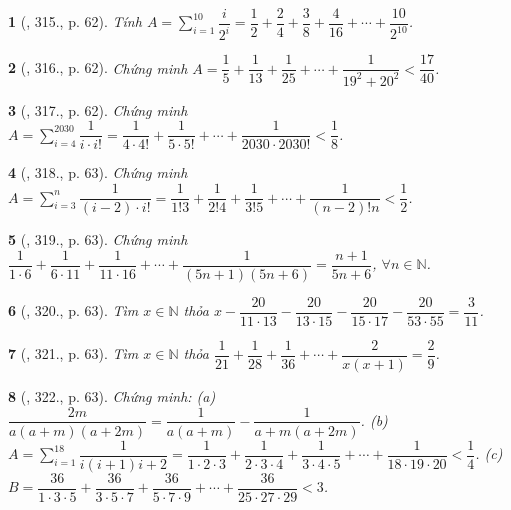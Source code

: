 \documentclass{article}
\newtheorem{baitoan}{}
\begin{document}
\begin{baitoan}[\cite{Tuyen_Toan_6}, 315., p. 62]
	Tính $A = \sum_{i=1}^{10} \dfrac{i}{2^i} = \dfrac{1}{2} + \dfrac{2}{4} + \dfrac{3}{8} + \dfrac{4}{16} + \cdots + \dfrac{10}{2^{10}}$.
\end{baitoan}

\begin{baitoan}[\cite{Tuyen_Toan_6}, 316., p. 62]
	Chứng minh $A = \dfrac{1}{5} + \dfrac{1}{13} + \dfrac{1}{25} + \cdots + \dfrac{1}{19^2 + 20^2} < \dfrac{17}{40}$.
\end{baitoan}

\begin{baitoan}[\cite{Tuyen_Toan_6}, 317., p. 62]
	Chứng minh $A = \sum_{i=4}^{2030} \dfrac{1}{i\cdot i!} = \dfrac{1}{4\cdot4!} + \dfrac{1}{5\cdot5!} + \cdots + \dfrac{1}{2030\cdot2030!} < \dfrac{1}{8}$.
\end{baitoan}

\begin{baitoan}[\cite{Tuyen_Toan_6}, 318., p. 63]
	Chứng minh $A = \sum_{i=3}^n \dfrac{1}{(i - 2)\cdot i!} = \dfrac{1}{1!3} + \dfrac{1}{2!4} + \dfrac{1}{3!5} + \cdots + \dfrac{1}{(n - 2)!n} < \dfrac{1}{2}$.
\end{baitoan}

\begin{baitoan}[\cite{Tuyen_Toan_6}, 319., p. 63]
	Chứng minh $\dfrac{1}{1\cdot6} + \dfrac{1}{6\cdot11} + \dfrac{1}{11\cdot16} + \cdots + \dfrac{1}{(5n + 1)(5n + 6)} = \dfrac{n + 1}{5n + 6}$, $\forall n\in\mathbb{N}$.
\end{baitoan}

\begin{baitoan}[\cite{Tuyen_Toan_6}, 320., p. 63]
	Tìm $x\in\mathbb{N}$ thỏa $x - \dfrac{20}{11\cdot13} - \dfrac{20}{13\cdot15} - \dfrac{20}{15\cdot17} - \dfrac{20}{53\cdot55} = \dfrac{3}{11}$.
\end{baitoan}

\begin{baitoan}[\cite{Tuyen_Toan_6}, 321., p. 63]
	Tìm $x\in\mathbb{N}$ thỏa $\dfrac{1}{21} + \dfrac{1}{28} + \dfrac{1}{36} + \cdots + \dfrac{2}{x(x + 1)} = \dfrac{2}{9}$.
\end{baitoan}

\begin{baitoan}[\cite{Tuyen_Toan_6}, 322., p. 63]
	Chứng minh: (a) $\dfrac{2m}{a(a + m)(a + 2m)} = \dfrac{1}{a(a + m)} - \dfrac{1}{{a + m}(a + 2m)}$. (b) $A = \sum_{i=1}^{18} \dfrac{1}{i(i + 1){i + 2}} = \dfrac{1}{1\cdot2\cdot3} + \dfrac{1}{2\cdot3\cdot4} + \dfrac{1}{3\cdot4\cdot5} + \cdots + \dfrac{1}{18\cdot19\cdot20} < \dfrac{1}{4}$. (c) $B = \dfrac{36}{1\cdot3\cdot5} + \dfrac{36}{3\cdot5\cdot7} + \dfrac{36}{5\cdot7\cdot9} + \cdots + \dfrac{36}{25\cdot27\cdot29} < 3$.
\end{baitoan}
\end{document}
